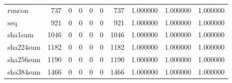 \begin{longtable}{lrrrrrrrrr}
runcon    &                                                737 &                                                  0 &                                                  0 &                                                  0 &                                                  0 &                                                737 &                                           1.000000 &                               1.000000 &                             1.000000 \\
seq       &                                                921 &                                                  0 &                                                  0 &                                                  0 &                                                  0 &                                                921 &                                           1.000000 &                               1.000000 &                             1.000000 \\
sha1sum   &                                               1046 &                                                  0 &                                                  0 &                                                  0 &                                                  0 &                                               1046 &                                           1.000000 &                               1.000000 &                             1.000000 \\
sha224sum &                                               1182 &                                                  0 &                                                  0 &                                                  0 &                                                  0 &                                               1182 &                                           1.000000 &                               1.000000 &                             1.000000 \\
sha256sum &                                               1190 &                                                  0 &                                                  0 &                                                  0 &                                                  0 &                                               1190 &                                           1.000000 &                               1.000000 &                             1.000000 \\
sha384sum &                                               1466 &                                                  0 &                                                  0 &                                                  0 &                                                  0 &                                               1466 &                                           1.000000 &                               1.000000 &                             1.000000 \\

\end{longtable}
